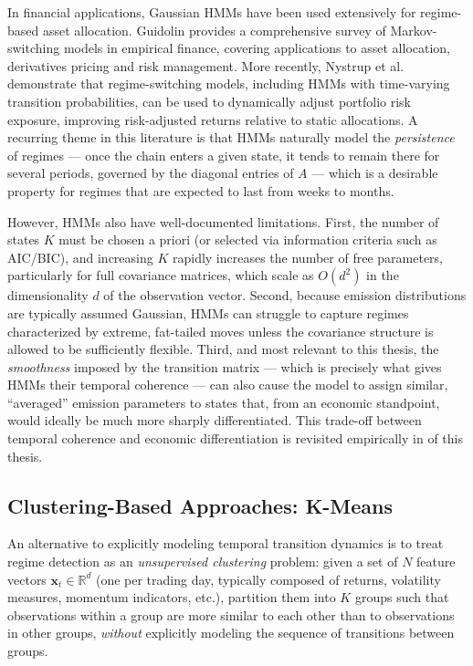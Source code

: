 In financial applications, Gaussian HMMs have been used extensively for
regime-based asset allocation. Guidolin \cite{guidolin2011} provides a
comprehensive survey of Markov-switching models in empirical finance,
covering applications to asset allocation, derivatives pricing and risk
management. More recently, Nystrup et al. \cite{nystrup2020} demonstrate
that regime-switching models, including HMMs with time-varying transition
probabilities, can be used to dynamically adjust portfolio risk exposure,
improving risk-adjusted returns relative to static allocations. A
recurring theme in this literature is that HMMs naturally model the
\emph{persistence} of regimes --- once the chain enters a given state, it
tends to remain there for several periods, governed by the diagonal
entries of $A$ --- which is a desirable property for regimes that are
expected to last from weeks to months.

However, HMMs also have well-documented limitations. First, the number of
states $K$ must be chosen a priori (or selected via information criteria
such as AIC/BIC), and increasing $K$ rapidly increases the number of free
parameters, particularly for full covariance matrices, which scale as
$O(d^2)$ in the dimensionality $d$ of the observation vector. Second,
because emission distributions are typically assumed Gaussian, HMMs can
struggle to capture regimes characterized by extreme, fat-tailed moves
unless the covariance structure is allowed to be sufficiently flexible.
Third, and most relevant to this thesis, the \emph{smoothness} imposed by
the transition matrix --- which is precisely what gives HMMs their
temporal coherence --- can also cause the model to assign similar,
``averaged'' emission parameters to states that, from an economic
standpoint, would ideally be much more sharply differentiated. This
trade-off between temporal coherence and economic differentiation is
revisited empirically in  of this thesis.

\subsection{Clustering-Based Approaches: K-Means}
\label{sec:soa-kmeans}

An alternative to explicitly modeling temporal transition dynamics is to
treat regime detection as an \emph{unsupervised clustering} problem:
given a set of $N$ feature vectors $\mathbf{x}_t \in \mathbb{R}^d$ (one
per trading day, typically composed of returns, volatility measures,
momentum indicators, etc.), partition them into $K$ groups such that
observations within a group are more similar to each other than to
observations in other groups, \emph{without} explicitly modeling the
sequence of transitions between groups.

